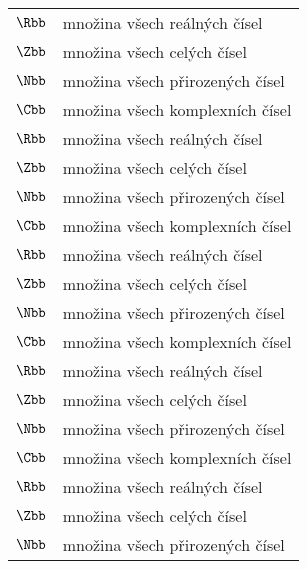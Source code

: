 \begin{flushleft}
\begin{longtable}[l]{ll}
  $\Rbb$                 & množina všech reálných čísel \\[1mm]
  $\Zbb$                 & množina všech celých čísel \\[1mm]
  $\Nbb$                 & množina všech přirozených čísel\\[1mm]
  $\Cbb$                 & množina všech komplexních čísel \\[1mm]
  $\Rbb$                 & množina všech reálných čísel \\[1mm]
  $\Zbb$                 & množina všech celých čísel \\[1mm]
  $\Nbb$                 & množina všech přirozených čísel\\[1mm]
  $\Cbb$                 & množina všech komplexních čísel \\[1mm]
  $\Rbb$                 & množina všech reálných čísel \\[1mm]
  $\Zbb$                 & množina všech celých čísel \\[1mm]
  $\Nbb$                 & množina všech přirozených čísel\\[1mm]
  $\Cbb$                 & množina všech komplexních čísel \\[1mm]
  $\Rbb$                 & množina všech reálných čísel \\[1mm]
  $\Zbb$                 & množina všech celých čísel \\[1mm]
  $\Nbb$                 & množina všech přirozených čísel\\[1mm]
  $\Cbb$                 & množina všech komplexních čísel \\[1mm]
  $\Rbb$                 & množina všech reálných čísel \\[1mm]
  $\Zbb$                 & množina všech celých čísel \\[1mm]
  $\Nbb$                 & množina všech přirozených čísel
\end{longtable}
\end{flushleft}

